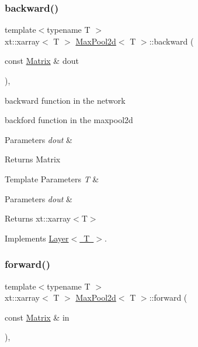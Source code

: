 \subsubsection{\texorpdfstring{backward()}{backward()}}
{\footnotesize\ttfamily template$<$typename T $>$ \\
xt\+::xarray$<$ T $>$ \mbox{\hyperlink{class_max_pool2d}{Max\+Pool2d}}$<$ T $>$\+::backward (\begin{DoxyParamCaption}\item[{const \mbox{\hyperlink{class_layer_a22b1e7286096aa62bd245536c8ebdaf1}{Matrix}} \&}]{dout }\end{DoxyParamCaption})\hspace{0.3cm}{\ttfamily [override]}, {\ttfamily [virtual]}}



backward function in the network 

backford function in the maxpool2d


\begin{DoxyParams}{Parameters}
{\em dout} & \\
\hline
\end{DoxyParams}
\begin{DoxyReturn}{Returns}
Matrix
\end{DoxyReturn}

\begin{DoxyTemplParams}{Template Parameters}
{\em T} & \\
\hline
\end{DoxyTemplParams}

\begin{DoxyParams}{Parameters}
{\em dout} & \\
\hline
\end{DoxyParams}
\begin{DoxyReturn}{Returns}
xt\+::xarray$<$\+T$>$ 
\end{DoxyReturn}


Implements \mbox{\hyperlink{class_layer_ac4c13a3a85bfdd4d7d4d18669e3299fe}{Layer$<$ T $>$}}.

\mbox{\label{class_max_pool2d_a424de7878c64a058a8549362dae448f0}} 
\subsubsection{\texorpdfstring{forward()}{forward()}}
{\footnotesize\ttfamily template$<$typename T $>$ \\
xt\+::xarray$<$ T $>$ \mbox{\hyperlink{class_max_pool2d}{Max\+Pool2d}}$<$ T $>$\+::forward (\begin{DoxyParamCaption}\item[{const \mbox{\hyperlink{class_layer_a22b1e7286096aa62bd245536c8ebdaf1}{Matrix}} \&}]{in }\end{DoxyParamCaption})\hspace{0.3cm}{\ttfamily [override]}, {\ttfamily [virtual]}}



